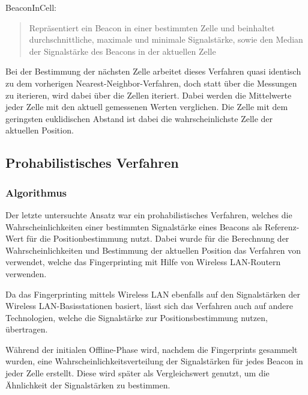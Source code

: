 BeaconInCell:
	\begin{quote}Repräsentiert ein Beacon in einer bestimmten Zelle und beinhaltet durchschnittliche, maximale und minimale Signalstärke, sowie den Median der Signalstärke des Beacons in der aktuellen Zelle\end{quote}

Bei der Bestimmung der nächsten Zelle arbeitet dieses Verfahren quasi identisch zu dem vorherigen Nearest-Neighbor-Verfahren, doch statt über die Messungen zu iterieren, wird dabei über die Zellen iteriert. Dabei werden die Mittelwerte jeder Zelle mit den aktuell gemessenen Werten verglichen. Die Zelle mit dem geringsten euklidischen Abstand ist dabei die wahrscheinlichste Zelle der aktuellen Position.

\subsection{Prohabilistisches Verfahren}
\label{sec:implementation:fingerprinting:positioning:probability}

\subsubsection{Algorithmus}
\label{sec:implementation:fingerprinting:positioning:probability:algorithm}

Der letzte untersuchte Ansatz war ein prohabilistisches Verfahren, welches die Wahrscheinlichkeiten einer bestimmten Signalstärke eines Beacons als Referenz-Wert für die Positionbestimmung nutzt. Dabei wurde für die Berechnung der Wahrscheinlichkeiten und Bestimmung der aktuellen Position das Verfahren von \citet{wifiFingerprintProbability} verwendet, welche das Fingerprinting mit Hilfe von Wireless LAN-Routern verwenden.

Da das Fingerprinting mittels Wireless LAN ebenfalls auf den Signalstärken der Wireless LAN-Basisstationen basiert, lässt sich das Verfahren auch auf andere Technologien, welche die Signalstärke zur Positionsbestimmung nutzen, übertragen.

Während der initialen Offline-Phase wird, nachdem die Fingerprints gesammelt wurden, eine Wahrscheinlichkeitsverteilung der Signalstärken für jedes Beacon in jeder Zelle erstellt. Diese wird später als Vergleichswert genutzt, um die Ähnlichkeit der Signalstärken zu bestimmen.

